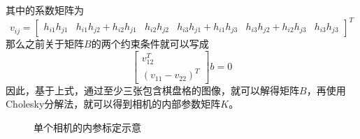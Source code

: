 其中的系数矩阵为
\begin{equation}
    v_{ij}=\left[ \begin{array}{cccccc} h_{i1}h_{j1} & h_{i1}h_{j2}+h_{i2}h_{j1} & h_{i2}h_{j2} & h_{i3}h_{j1}+h_{i1}h_{j3} & h_{i3}h_{j2}+h_{i2}h_{j3} & h_{i3}h_{j3} \end{array} \right]^T
\end{equation}
那么之前关于矩阵\(B\)的两个约束条件就可以写成
\begin{equation}
    \left[ \begin{array}{c} v^T_{12} \\ (v_{11}-v_{22})^T \end{array} \right]b=0
\end{equation}
因此，基于上式，通过至少三张包含棋盘格的图像，就可以解得矩阵\(B\)，再使用Cholesky分解法，就可以得到相机的内部参数矩阵\(K\)。
\begin{figure}[htbp]
    \centering
    \caption{单个相机的内参标定示意\label{fig:calsingle}}
\end{figure}

